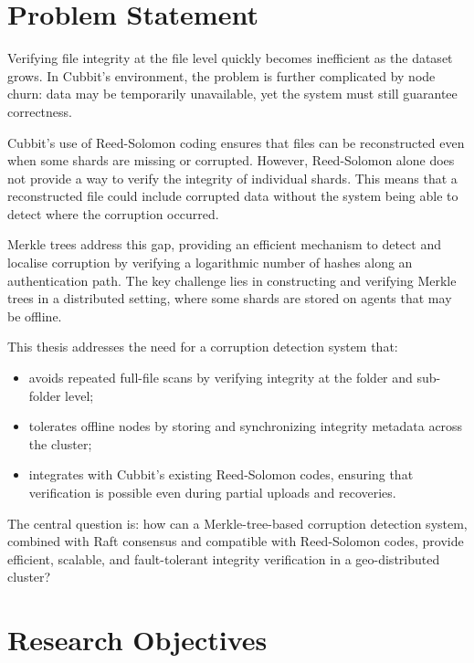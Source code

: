 \section{Problem Statement}
Verifying file integrity at the file level quickly becomes inefficient as the dataset grows. In Cubbit's environment, the problem is further complicated by node churn: data may be temporarily unavailable, yet the system must still guarantee correctness.

Cubbit's use of Reed-Solomon coding ensures that files can be reconstructed even when some shards are missing or corrupted. However, Reed-Solomon alone does not provide a way to verify the integrity of individual shards. This means that a reconstructed file could include corrupted data without the system being able to detect where the corruption occurred.

Merkle trees address this gap, providing an efficient mechanism to detect and localise corruption by verifying a logarithmic number of hashes along an authentication path. The key challenge lies in constructing and verifying Merkle trees in a distributed setting, where some shards are stored on agents that may be offline.

This thesis addresses the need for a corruption detection system that:
\begin{itemize}
\item avoids repeated full-file scans by verifying integrity at the folder and sub-folder level;
\item tolerates offline nodes by storing and synchronizing integrity metadata across the cluster;
\item integrates with Cubbit's existing Reed-Solomon codes, ensuring that verification is possible even during partial uploads and recoveries.
\end{itemize}

The central question is: how can a Merkle-tree-based corruption detection system, combined with Raft consensus and compatible with Reed-Solomon codes, provide efficient, scalable, and fault-tolerant integrity verification in a geo-distributed cluster?

\section{Research Objectives}

